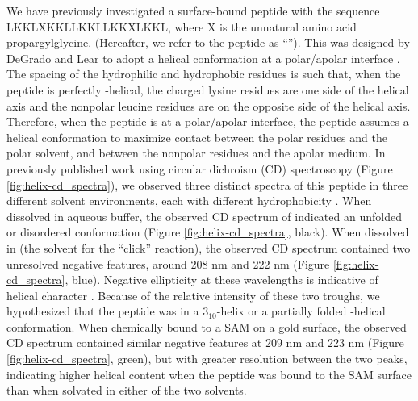 We have previously investigated a surface-bound peptide with the sequence LKKLXKKLLKKLLKKXLKKL, where X is the unnatural amino acid propargylglycine. 
(Hereafter, we refer to the peptide as ``\pep{}''). 
This was designed by DeGrado and Lear to adopt a helical conformation at a polar/apolar interface \cite{DeGrado1985}.   
The spacing of the hydrophilic and hydrophobic residues is such that, when the peptide is perfectly \textalpha{}-helical, the charged lysine residues are one side of the helical axis and the nonpolar leucine residues are on the opposite side of the helical axis. 
Therefore, when the peptide is at a polar/apolar interface, the peptide assumes a helical conformation to maximize contact between the polar residues and the polar solvent, and between the nonpolar residues and the apolar medium\cite{DeGrado1985}. 
In previously published work using circular dichroism (CD) spectroscopy (Figure \ref{fig:helix-cd_spectra}), we observed three distinct spectra of this peptide in three different solvent environments, each with different hydrophobicity \cite{Gallardo2012}.   
When dissolved in aqueous buffer, the observed CD spectrum of \pep{} indicated an unfolded or disordered conformation (Figure \ref{fig:helix-cd_spectra}, black). 
When dissolved in \tbawat{} (the solvent for the ``click'' reaction), the observed CD spectrum contained two unresolved negative features, around 208 nm and 222 nm (Figure \ref{fig:helix-cd_spectra}, blue). 
Negative ellipticity at these wavelengths is indicative of helical character \cite{Holzwarth1965, Woody1967, Johnson1988, Berova2000circular, Kelly2005}.
Because of the relative intensity of these two troughs, we hypothesized that the peptide was in a $3_{10}$-helix or a partially folded \textalpha{}-helical conformation. 
When chemically bound to a SAM on a gold surface, the observed CD spectrum contained similar negative features at 209 nm and 223 nm (Figure \ref{fig:helix-cd_spectra}, green), but with greater resolution between the two peaks, indicating higher helical content when the peptide was bound to the SAM surface than when solvated in either of the two solvents. 

